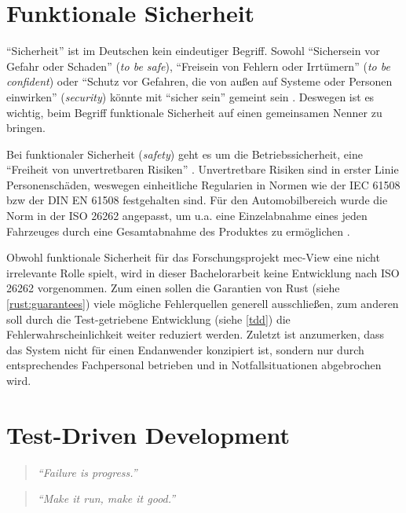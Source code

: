 		
		
	
	
	
\section{Funktionale Sicherheit}
\label{com:safety}

\enquote{Sicherheit} ist im Deutschen kein eindeutiger Begriff.
Sowohl \enquote{Sichersein vor Gefahr oder Schaden} (\textit{to be safe}), \enquote{Freisein von Fehlern oder Irrtümern} (\textit{to be confident}) oder \enquote{Schutz vor Gefahren, die von außen auf Systeme oder Personen einwirken} (\textit{security}) könnte mit \enquote{sicher sein} gemeint sein \cite[5-6]{safety}.
Deswegen ist es wichtig, beim Begriff funktionale Sicherheit auf einen gemeinsamen Nenner zu bringen.

Bei funktionaler Sicherheit (\textit{safety}) geht es um die Betriebssicherheit, eine \enquote{Freiheit von unvertretbaren Risiken} \cite[6]{safety}.
Unvertretbare Risiken sind in erster Linie Personenschäden, weswegen einheitliche Regularien in Normen wie der IEC 61508 bzw der DIN EN 61508 festgehalten sind.
Für den Automobilbereich wurde die Norm in der ISO 26262 angepasst, um u.a. eine Einzelabnahme eines jeden Fahrzeuges durch eine Gesamtabnahme des Produktes zu ermöglichen \cite[14]{safety}.

Obwohl funktionale Sicherheit für das Forschungsprojekt \gls{mec}-View eine nicht irrelevante Rolle spielt, wird in dieser Bachelorarbeit keine Entwicklung nach ISO 26262 vorgenommen.
Zum einen sollen die Garantien von Rust (siehe \autoref{rust:guarantees}) viele mögliche Fehlerquellen generell ausschließen, zum anderen soll durch die Test-getriebene Entwicklung (siehe \autoref{tdd}) die Fehlerwahrscheinlichkeit weiter reduziert werden.
Zuletzt ist anzumerken, dass das System nicht für einen Endanwender konzipiert ist, sondern nur durch entsprechendes Fachpersonal betrieben und in Notfallsituationen abgebrochen wird.

	
\section{Test-Driven Development}
\label{tdd}

\begin{quotation}
	\textit{\enquote{Failure is progress.}}
	\cite[5]{tdd}
\end{quotation}
\begin{quotation}
	\textit{\enquote{Make it run, make it good.}}
	\cite[24]{tdd}
\end{quotation}

